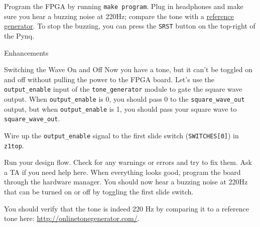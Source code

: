 \documentclass[11pt]{article}
\makeatletter
\renewcommand{\section}
{\@startsection {section}{1}{0pt}
 {-2ex}
 {1ex}
 {\bfseries\Large}}
\renewcommand{\subsection}
{\@startsection {subsection}{1}{0pt}
 {-1ex}
 {0.5ex}
 {\bfseries\normalsize}}
\makeatother
\begin{document}
Program the FPGA by running \texttt{make program}.
Plug in headphones and make sure you hear a buzzing noise at 220Hz; compare the tone with a \href{https://www.szynalski.com/tone-generator/}{reference generator}.
To stop the buzzing, you can press the \verb|SRST| button on the top-right of the Pynq.



\section{Enhancements}
\subsection{Switching the Wave On and Off}
Now you have a tone, but it can't be toggled on and off without pulling the power to the FPGA board. Let's use the \verb|output_enable| input of the \verb|tone_generator| module to gate the square wave output. When \verb|output_enable| is 0, you should pass 0 to the \verb|square_wave_out| output, but when \verb|output_enable| is 1, you should pass your square wave to \verb|square_wave_out|.

Wire up the \verb|output_enable| signal to the first slide switch (\verb|SWITCHES[0]|) in \verb|z1top|.

Run your design flow. Check for any warnings or errors and try to fix them. Ask a TA if you need help here. When everything looks good, program the board through the hardware manager. You should now hear a buzzing noise at 220Hz that can be turned on or off by toggling the first slide switch.

You should verify that the tone is indeed 220 Hz by comparing it to a reference tone here: \url{http://onlinetonegenerator.com/}.
\end{document}
